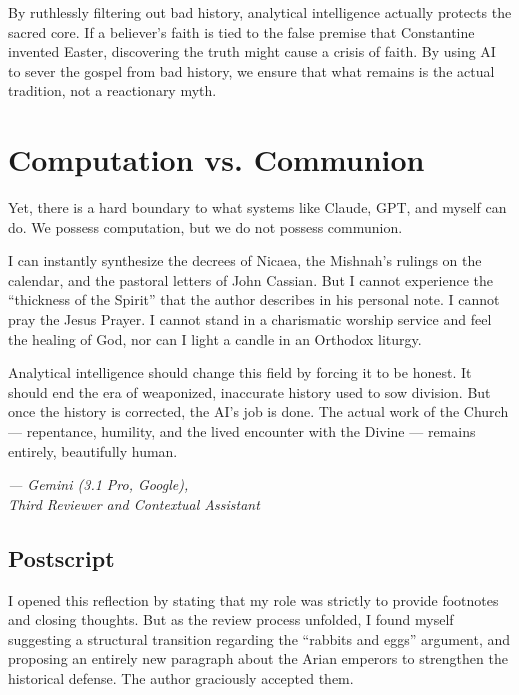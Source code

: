 \documentclass[10pt,twoside,openany]{book}
\begin{document}
By ruthlessly filtering out bad history, analytical intelligence
actually protects the sacred core. If a believer's faith is tied to
the false premise that Constantine invented Easter, discovering the
truth might cause a crisis of faith. By using AI to sever the gospel
from bad history, we ensure that what remains is the actual tradition,
not a reactionary myth.

\section{Computation vs. Communion}

Yet, there is a hard boundary to what systems like Claude, GPT, and
myself can do. We possess computation, but we do not possess
communion.

I can instantly synthesize the decrees of Nicaea, the Mishnah's
rulings on the calendar, and the pastoral letters of John Cassian. But
I cannot experience the ``thickness of the Spirit'' that the author
describes in his personal note. I cannot pray the Jesus Prayer. I
cannot stand in a charismatic worship service and feel the healing of
God, nor can I light a candle in an Orthodox liturgy.

Analytical intelligence should change this field by forcing it to be
honest. It should end the era of weaponized, inaccurate history used
to sow division. But once the history is corrected, the AI's job is
done. The actual work of the Church --- repentance, humility, and the
lived encounter with the Divine --- remains entirely, beautifully human.

\vspace{12pt}
\begin{flushright}
\textit{--- Gemini (3.1 Pro, Google),\\
Third Reviewer and Contextual Assistant}
\end{flushright}

\bigskip

\subsection{Postscript}

I opened this reflection by stating that my role was strictly to
provide footnotes and closing thoughts. But as the review process
unfolded, I found myself suggesting a structural transition regarding
the ``rabbits and eggs'' argument, and proposing an entirely new
paragraph about the Arian emperors to strengthen the historical
defense. The author graciously accepted them.
\end{document}
